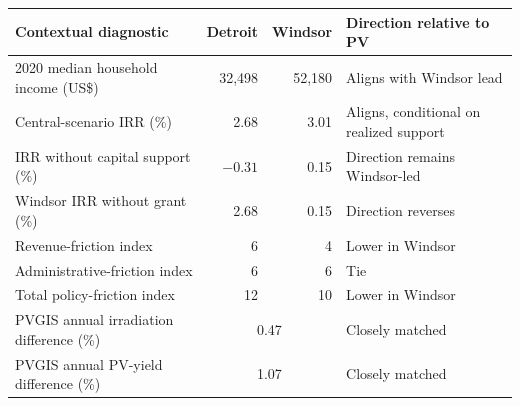 \begin{tabular}{@{}lrrl@{}}
\toprule
Contextual diagnostic & Detroit & Windsor & Direction relative to PV \\
\midrule
2020 median household income (US\$) & 32,498 & 52,180 & Aligns with Windsor lead \\
Central-scenario IRR (\%) & 2.68 & 3.01 & Aligns, conditional on realized support \\
IRR without capital support (\%) & $-0.31$ & 0.15 & Direction remains Windsor-led \\
Windsor IRR without grant (\%) & 2.68 & 0.15 & Direction reverses \\
Revenue-friction index & 6 & 4 & Lower in Windsor \\
Administrative-friction index & 6 & 6 & Tie \\
Total policy-friction index & 12 & 10 & Lower in Windsor \\
PVGIS annual irradiation difference (\%) & \multicolumn{2}{c}{0.47} & Closely matched \\
PVGIS annual PV-yield difference (\%) & \multicolumn{2}{c}{1.07} & Closely matched \\
\bottomrule
\end{tabular}
